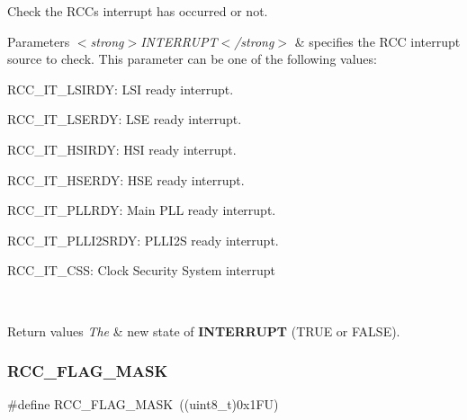 Check the R\+CC\textquotesingle{}s interrupt has occurred or not. 


\begin{DoxyParams}{Parameters}
{\em $<$strong$>$\+I\+N\+T\+E\+R\+R\+U\+P\+T$<$/strong$>$} & specifies the R\+CC interrupt source to check. This parameter can be one of the following values\+: \begin{DoxyItemize}
\item R\+C\+C\+\_\+\+I\+T\+\_\+\+L\+S\+I\+R\+DY\+: L\+SI ready interrupt. \item R\+C\+C\+\_\+\+I\+T\+\_\+\+L\+S\+E\+R\+DY\+: L\+SE ready interrupt. \item R\+C\+C\+\_\+\+I\+T\+\_\+\+H\+S\+I\+R\+DY\+: H\+SI ready interrupt. \item R\+C\+C\+\_\+\+I\+T\+\_\+\+H\+S\+E\+R\+DY\+: H\+SE ready interrupt. \item R\+C\+C\+\_\+\+I\+T\+\_\+\+P\+L\+L\+R\+DY\+: Main P\+LL ready interrupt. \item R\+C\+C\+\_\+\+I\+T\+\_\+\+P\+L\+L\+I2\+S\+R\+DY\+: P\+L\+L\+I2S ready interrupt. \item R\+C\+C\+\_\+\+I\+T\+\_\+\+C\+SS\+: Clock Security System interrupt \end{DoxyItemize}
\\
\hline
\end{DoxyParams}

\begin{DoxyRetVals}{Return values}
{\em The} & new state of {\bfseries I\+N\+T\+E\+R\+R\+U\+PT} (T\+R\+UE or F\+A\+L\+SE). \\
\hline
\end{DoxyRetVals}
\mbox{\label{group___r_c_c___flags___interrupts___management_ga80017c6bf8a5c6f53a1a21bb8db93a82}} 
\subsubsection{\texorpdfstring{R\+C\+C\+\_\+\+F\+L\+A\+G\+\_\+\+M\+A\+SK}{RCC\_FLAG\_MASK}}
{\footnotesize\ttfamily \#define R\+C\+C\+\_\+\+F\+L\+A\+G\+\_\+\+M\+A\+SK~((uint8\+\_\+t)0x1\+F\+U)}



